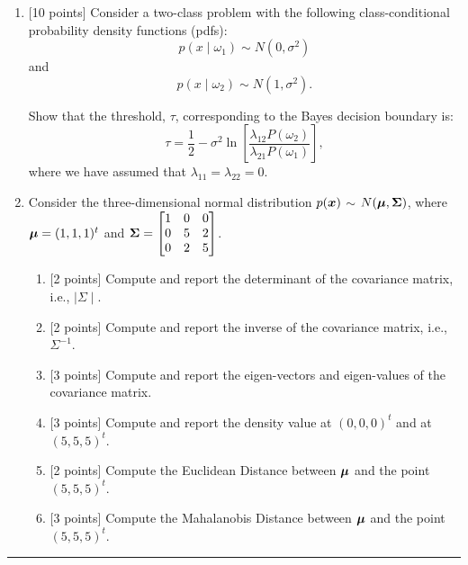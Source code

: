 \documentclass[11pt]{article}
\newcommand{\myvector}[1]{\mbox{\boldmath$#1$}}
\begin{document}
\begin{enumerate}
(c) Let $P(\omega_1) = P(\omega_2) = 1/2$. Suppose the loss function is defined as follows: $\lambda_{11}=\lambda_{22}=0$, $\lambda_{12}=2$ and $\lambda_{21}=1$. Compute the Bayes decision boundary and write down the Bayes decision rule. Note that  $\lambda_{ij}$ represents the loss incurred when a sample from class $\omega_j$ is classified as $\omega_i$. Mark the decision boundary and decision regions on the figure in (a).

(d) Intuitively explain why the boundaries in (b) and (c) are different.


\item{[10 points]} Consider a two-class problem with the following class-conditional probability density functions (pdfs):
\[
p(x \mid \omega_1) \sim N(0, \sigma^2)
\]
and 
\[
p(x \mid \omega_2) \sim N(1, \sigma^2).
\]

Show that the threshold, $\tau$, corresponding to the Bayes decision boundary is: 
\[
\tau = \frac{1}{2} - \sigma^2 \ln \left[\frac{\lambda_{12}P(\omega_2)}{\lambda_{21}P(\omega_1)}\right],
\]
where we have assumed that $\lambda_{11} = \lambda_{22} = 0$. 


\item Consider the three-dimensional normal distribution
$p(\myvector{x})$ $\sim$ $N(\myvector{\mu},
\myvector{\Sigma})$, where $\myvector{\mu} = (1, 1, 1)^t$ and
$\myvector{\Sigma} = \begin{bmatrix} 1 & 0 & 0 \\ 0 & 5 & 2 \\ 0 & 2
& 5 \end{bmatrix}$. 


\begin{enumerate}
\item{[2 points]} Compute and report the determinant of the covariance matrix, i.e., $\mid \Sigma \mid$.
\item{[2 points]} Compute and report the inverse of the covariance matrix, i.e., $\Sigma^{-1}$.
\item{[3 points]} Compute and report the eigen-vectors and eigen-values of the covariance matrix. 
\item{[3 points]} Compute and report the density value at $(0, 0, 0)^t$ and at $(5,5,5)^t$. 
\item{[2 points]} Compute the Euclidean Distance between $\myvector{\mu}$ and the point $(5,5,5)^t$. 
\item{[3 points]} Compute the Mahalanobis Distance between $\myvector{\mu}$ and the point $(5,5,5)^t$. 

\end{enumerate}



\end{enumerate}

\rule{7in}{1pt}
\end{document}
